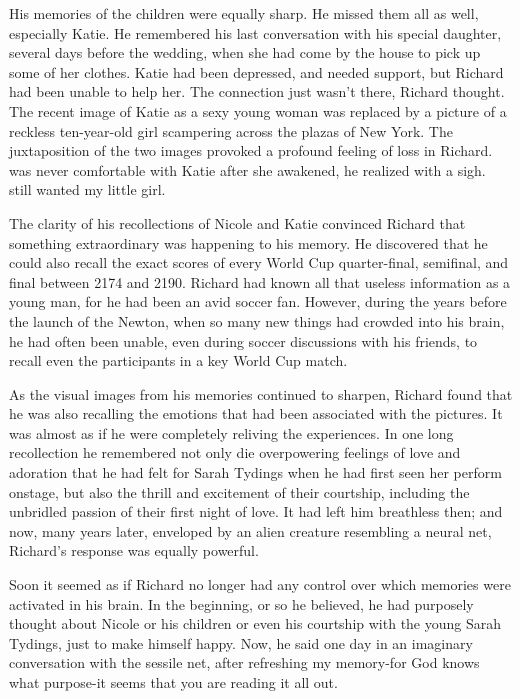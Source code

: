 \documentclass[]{article}
\begin{document}
{{His memories of the children were equally sharp. He missed them all as well, especially Katie. He remembered his last conversation with his special daughter, several days before the wedding, when she had come by the house to pick up some of her clothes. Katie had been depressed, and needed support, but Richard had been unable to help her. The connection just wasn’t there, Richard thought. The recent image of Katie as a sexy young woman was replaced by a picture of a reckless ten-year-old girl scampering across the plazas of New York. The juxtaposition of the two images provoked a profound feeling of loss in Richard. was never comfortable with Katie after she awakened, he realized with a sigh. still wanted my little girl.

The clarity of his recollections of Nicole and Katie convinced Richard that something extraordinary was happening to his memory. He discovered that he could also recall the exact scores of every World Cup quarter-final, semifinal, and final between 2174 and 2190. Richard had known all that useless information as a young man, for he had been an avid soccer fan. However, during the years before the launch of the Newton, when so many new things had crowded into his brain, he had often been unable, even during soccer discussions with his friends, to recall even the participants in a key World Cup match.

As the visual images from his memories continued to sharpen, Richard found that he was also recalling the emotions that had been associated with the pictures. It was almost as if he were completely reliving the experiences. In one long recollection he remembered not only die overpowering feelings of love and adoration that he had felt for Sarah Tydings when he had first seen her perform onstage, but also the thrill and excitement of their courtship, including the unbridled passion of their first night of love. It had left him breathless then; and now, many years later, enveloped by an alien creature resembling a neural net, Richard’s response was equally powerful.

Soon it seemed as if Richard no longer had any control over which memories were activated in his brain. In the beginning, or so he believed, he had purposely thought about Nicole or his children or even his courtship with the young Sarah Tydings, just to make himself happy. Now, he said one day in an imaginary conversation with the sessile net, after refreshing my memory-for God knows what purpose-it seems that you are reading it all out.

}}
\end{document}
